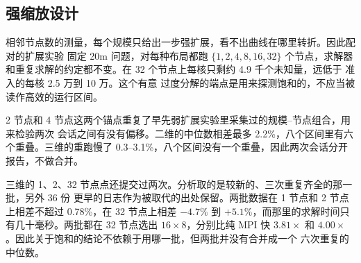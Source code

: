 \documentclass[11pt,a4paper,oneside]{report}
\let\OldSubsection\subsection
\renewcommand{\subsection}{\FloatBarrier\OldSubsection}
\begin{document}
\subsection{强缩放设计}
\label{sec:strong20m}
相邻节点数的测量，每个规模只给出一步强扩展，看不出曲线在哪里转折。因此配对的扩展实验
固定 20m 问题，对每种布局都跑 $\{1,2,4,8,16,32\}$ 个节点，求解器和重复求解的约定都不变。在 32
个节点上每核只剩约 4.9 千个未知量，远低于  准入的每核 2.5 万到 10 万。这个有意
过度分解的端点是用来探测饱和的，不应当被读作高效的运行区间。

2 节点和 4 节点这两个锚点重复了早先弱扩展实验里采集过的规模--节点组合，用来检验两次
会话之间有没有偏移。二维的中位数相差最多 2.2\%，八个区间里有六个重叠。三维的重跑慢了
0.3--3.1\%，八个区间没有一个重叠，因此两次会话分开报告，不做合并。

三维的 1、2、32 节点点还提交过两次。分析取的是较新的、三次重复齐全的那一批，另外 36 份
更早的日志作为被取代的出处保留。两批数据在 1 节点和 2 节点上相差不超过 0.78\%，在 32 节点上相差
$-4.7\%$ 到 $+5.1\%$，而那里的求解时间只有几十毫秒。两批都在 32 节点选出 $16\times8$，分别比纯
MPI 快 $3.81\times$ 和 $4.00\times$。因此关于饱和的结论不依赖于用哪一批，但两批并没有合并成一个
六次重复的中位数。

\end{document}
